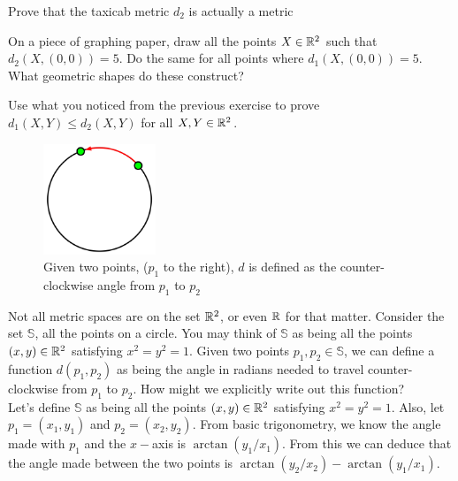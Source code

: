 \begin{exercise}
    Prove that the taxicab metric $d_2$ is actually a metric
\end{exercise}
\vspace{-3mm}

\begin{exercise}
    On a piece of graphing paper, draw all the points $X\in\mathbb{R}^2$ such that $d_{\text{2}}(X,(0,0))=5$. Do the same for all points where $d_{\text{1}}(X,(0,0))=5$. What geometric shapes do these construct?
\end{exercise}

\begin{exercise}
    Use what you noticed from the previous exercise to prove \\
    $d_{\text{1}}(X,Y)\leq d_{\text{2}}(X,Y)$ for all $X,Y\in\mathbb{R}^2$.
\end{exercise}

\begin{figure}
  \begin{center}
      \vspace{-\intextsep-5mm}

    \includegraphics[width=0.3\textwidth]{Images/Chap0/Circle Metric.png}
  \end{center}
  \caption{Given two points, ($p_1$ to the right), $d$ is defined as the counter-clockwise angle from $p_1$ to $p_2$}
\end{figure}

Not all metric spaces are on the set $\mathbb{R}^2$, or even $\mathbb{R}$ for that matter. Consider the set $\mathbb{S}$, all the points on a circle. You may think of $\mathbb{S}$ as being all the points $(x,y)\in\mathbb{R}^2$ satisfying $x^2=y^2=1$. Given two points $p_1,p_2\in\mathbb{S}$, we can define a function $d(p_1,p_2)$ as being the angle in radians needed to travel counter-clockwise from $p_1$ to $p_2$. How might we explicitly write out this function?\\

Let's define $\mathbb{S}$ as being all the points $(x,y)\in\mathbb{R}^2$ satisfying $x^2=y^2=1$. Also, let $p_1=(x_1,y_1)$ and $p_2=(x_2,y_2)$. From basic trigonometry, we know the angle made with $p_1$ and the $x-$axis is $\arctan(y_1/x_1)$. From this we can deduce that the angle made between the two points is $\arctan(y_2/x_2)-\arctan(y_1/x_1)$. 

